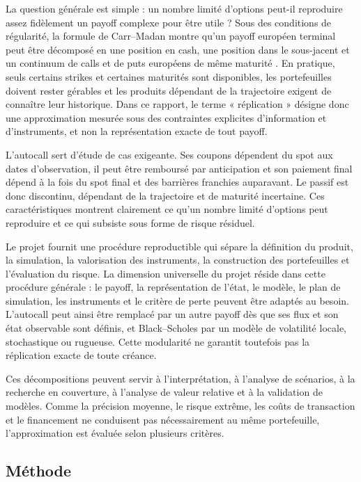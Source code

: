 \documentclass[12pt,a4paper]{article}
\newcommand{\1}{\mathbf{1}}
\begin{document}
La question générale est simple : un nombre limité d'options peut-il reproduire assez fidèlement un payoff complexe pour être utile ? Sous des conditions de régularité, la formule de Carr--Madan montre qu'un payoff européen terminal peut être décomposé en une position en cash, une position dans le sous-jacent et un continuum de calls et de puts européens de même maturité \cite{carrmadan1998}. En pratique, seuls certains strikes et certaines maturités sont disponibles, les portefeuilles doivent rester gérables et les produits dépendant de la trajectoire exigent de connaître leur historique. Dans ce rapport, le terme « réplication » désigne donc une approximation mesurée sous des contraintes explicites d'information et d'instruments, et non la représentation exacte de tout payoff.

L'autocall sert d'étude de cas exigeante. Ses coupons dépendent du spot aux dates d'observation, il peut être remboursé par anticipation et son paiement final dépend à la fois du spot final et des barrières franchies auparavant. Le passif est donc discontinu, dépendant de la trajectoire et de maturité incertaine. Ces caractéristiques montrent clairement ce qu'un nombre limité d'options peut reproduire et ce qui subsiste sous forme de risque résiduel.

Le projet fournit une procédure reproductible qui sépare la définition du produit, la simulation, la valorisation des instruments, la construction des portefeuilles et l'évaluation du risque. La dimension universelle du projet réside dans cette procédure générale : le payoff, la représentation de l'état, le modèle, le plan de simulation, les instruments et le critère de perte peuvent être adaptés au besoin. L'autocall peut ainsi être remplacé par un autre payoff dès que ses flux et son état observable sont définis, et Black--Scholes par un modèle de volatilité locale, stochastique ou rugueuse. Cette modularité ne garantit toutefois pas la réplication exacte de toute créance.

Ces décompositions peuvent servir à l'interprétation, à l'analyse de scénarios, à la recherche en couverture, à l'analyse de valeur relative et à la validation de modèles. Comme la précision moyenne, le risque extrême, les coûts de transaction et le financement ne conduisent pas nécessairement au même portefeuille, l'approximation est évaluée selon plusieurs critères.

\subsection*{Méthode}
\end{document}

